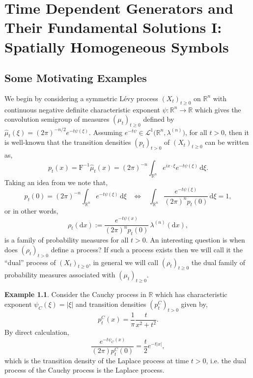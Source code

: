 \documentclass[a4paper, 12pt]{report}
\theoremstyle{cor}
\theoremstyle{remark}
\theoremstyle{definition}
\newtheorem{eg}[theorem]{Example}
\begin{document}
\newpage\null

\chapter{Time Dependent Generators and Their Fundamental Solutions I: Spatially Homogeneous Symbols}

\section{Some Motivating Examples}\label{Se.SMEg}

We begin by considering a symmetric L\'evy process $(X_t)_{t \ge 0}$ on $\mathbb{R}^n$ with continuous negative definite characteristic exponent $\psi : \mathbb{R}^n \to \mathbb{R}$ which gives the convolution semigroup of measures $(\mu_t)_{t \ge 0}$ defined by $\hat{\mu}_t(\xi) = (2\pi)^{-n/2}e^{-t\psi(\xi)}$.  Assuming $e^{-t\psi} \in \mathcal{L}^1\big(\mathbb{R}^n, \lambda^{(n)}\big)$, for all $t > 0$, then it is well-known that the transition densities $(p_t)_{t > 0}$ of $(X_t)_{t \ge 0}$ can be written as,
\begin{equation}\label{LPTransitionDensities}
p_t(x) = \mathrm{F}^{-1}\hat{\mu}_t(x)= (2\pi)^{-n}\int_{\mathbb{R}^n}e^{ix\cdot\xi}e^{-t\psi(\xi)}\,\mathrm{d}\xi.
\end{equation}
Taking an idea from \cite{Paper} we note that,
$$
p_t(0) = (2\pi)^{-n}\int_{\mathbb{R}^n}e^{-t\psi(\xi)}\,\mathrm{d}\xi \,\,\,\,\, \Leftrightarrow \,\,\,\,\, \int_{\mathbb{R}^n}\frac{e^{-t\psi(\xi)}}{(2\pi)^np_t(0)}\,\mathrm{d}\xi = 1,
$$
or in other words,
\begin{equation}
\rho_t(\mathrm{d}x) := \frac{e^{-t\psi(x)}}{(2\pi)^np_t(0)}\,\lambda^{(n)}(\mathrm{d}x),\label{DPPM}
\end{equation}
is a family of probability measures for all $t > 0$.  An interesting question is when does $(\rho_t)_{t > 0}$ define a process?  If such a process exists then we will call it the ``dual'' process of $(X_t)_{t \ge 0}$, in general we will call $(\rho_t)_{t \ge 0}$ the dual family of probability measures associated with $(\mu_t)_{t \ge 0}$.

\begin{eg}\label{DofCPeg}
Consider the Cauchy process in $\mathbb{R}$ which has characteristic exponent $\psi_C(\xi) = |\xi|$ and transition densities $(p_t^C)_{t > 0}$ given by,
$$
p_t^C(x) = \frac{1}{\pi}\frac{t}{x^2 + t^2}.
$$
By direct calculation,
$$
\frac{e^{-t\psi_C(x)}}{(2\pi)p_t^C(0)} = \frac{t}{2}e^{-t|x|},
$$
which is the transition density of the Laplace process at time $t > 0$, i.e. the dual process of the Cauchy process is the Laplace process.
\end{eg}
\end{document}
